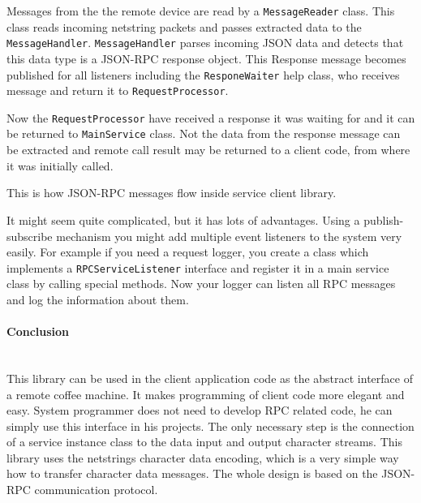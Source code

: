 Messages from the the remote device are read by a \texttt{MessageReader} class.
This class reads incoming netstring packets  and passes extracted data
to the \texttt{MessageHandler}. \texttt{MessageHandler} parses incoming JSON 
data and detects that this data type is a JSON-RPC response object. This
Response message becomes published for all listeners including the 
\texttt{ResponeWaiter} help class, who receives message and return it to
\texttt{RequestProcessor}. 


Now the \texttt{RequestProcessor} have received a response it was waiting for
and it can be returned to \texttt{MainService} class. Not the data from the 
response message can be extracted  and remote call result may be returned
to a client code, from where it was initially called.


This is how JSON-RPC messages flow inside service client library.

It might seem quite complicated, but it has lots of advantages. 
Using a publish-subscribe mechanism you might add  multiple event listeners to
the system very easily. 
For example if you need a request logger, you create a class which implements a
\texttt{RPCServiceListener} interface and register it in a main service class 
by calling special methods. Now your logger can listen all RPC
messages and log the information about them.

\paragraph{Conclusion} ~\\

This library can be used in the client application code as the abstract interface of a remote coffee machine.
It makes programming of client code more elegant and easy.
System programmer does not need to develop RPC related code, he can simply use this interface in his projects.
The only necessary step is the connection of a service instance class to the data input and output character streams.
This library uses the netstrings  character data encoding, which is a very simple way how to transfer character data messages.
The whole design is based on the JSON-RPC communication protocol.



